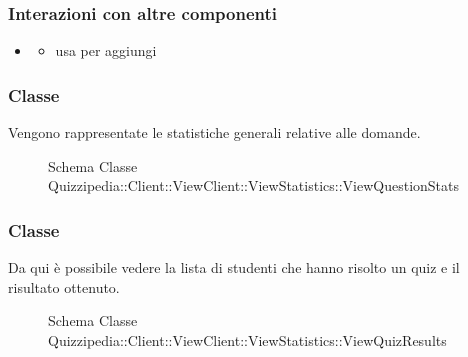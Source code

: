 \subsubsection{Interazioni con altre componenti}
\begin{itemize}
\item {}
\begin{itemize}
\item usa  per aggiungi
\end{itemize}
\end{itemize}
\subsubsection{Classe }
Vengono rappresentate le statistiche generali relative alle domande.
\begin{figure}[H]
\centering
\noindent{}
\caption[Schema Classe ViewQuestionStats]{Schema Classe Quizzipedia::Client::ViewClient::ViewStatistics::ViewQuestionStats}
\end{figure}
\subsubsection{Classe }
Da qui è possibile vedere la lista di studenti che hanno risolto un quiz e il risultato ottenuto.
\begin{figure}[H]
\centering
\noindent{}
\caption[Schema Classe ViewQuizResults]{Schema Classe Quizzipedia::Client::ViewClient::ViewStatistics::ViewQuizResults}
\end{figure}
